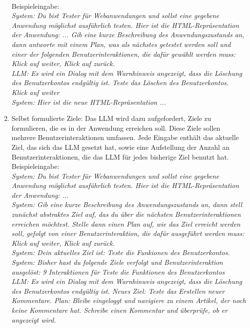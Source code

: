 \begin{enumerate}
    \\
    Beispieleingabe:
    \\
    \textit{System: Du bist Tester für Webanwendungen und sollst eine gegebene Anwendung möglichst ausführlich testen.
    Hier ist die HTML-Repräsentation der Anwendung: ... 
    Gib eine kurze Beschreibung des Anwendungszustands an, dann antworte mit einem Plan, was als nächstes getestet werden soll und einer der folgenden Benutzerinteraktionen, die dafür gewählt werden muss: Klick auf \dq weiter\dq, Klick auf \dq zurück\dq. 
    \\
    LLM: Es wird ein Dialog mit dem Warnhinweis angezeigt, dass die Löschung des Benutzerkontos endgültig ist.
    Teste das Löschen des Benutzerkontos.
    Klick auf \dq weiter\dq
    \\
    System: Hier ist die neue HTML-Repräsentation ...
    }
    \item
    Selbst formulierte Ziele: Das LLM wird dazu aufgefordert, Ziele zu formulieren, die es in der Anwendung erreichen soll.
    Diese Ziele sollen mehrere Benutzerinteraktionen umfassen.
    Jede Eingabe enthält das aktuelle Ziel, das sich das LLM gesetzt hat, sowie eine Aufstellung der Anzahl an Benutzerinteraktionen, die das LLM für jedes bisherige Ziel benutzt hat.
    \\
    Beispieleingabe:
    \\
    \textit{System: Du bist Tester für Webanwendungen und sollst eine gegebene Anwendung möglichst ausführlich testen.
    Hier ist die HTML-Repräsentation der Anwendung: ... 
    \\
    System: Gib eine kurze Beschreibung des Anwendungszustands an, dann stell zunächst abstraktes Ziel auf, das du über die nächsten Benutzerinteraktionen erreichen möchtest.
    Stelle dann einen Plan auf, wie das Ziel erreicht werden soll, gefolgt von einer Benutzerinteraktion, die dafür ausgeführt werden muss: Klick auf \dq weiter\dq, Klick auf \dq zurück\dq.
    \\
    System: Dein aktuelles Ziel ist: Teste die Funkionen des Benutzerkontos.
    \\
    System: Bisher hast du folgende Ziele verfolgt und Benutzerinteraktion ausgelöst: 9 Interaktionen für \glqq{}Teste die Funktionen des Benutzerkontos\grqq{}
    \\
    LLM: Es wird ein Dialog mit dem Warnhinweis angezeigt, dass die Löschung des Benutzerkontos endgültig ist.
    Neues Ziel: Teste das Erstellen neuer Kommentare.
    Plan: Bleibe eingeloggt und navigiere zu einem Artikel, der noch keine Kommentare hat. Schreibe einen Kommentar und überprüfe, ob er angezeigt wird.
}
\end{enumerate}
